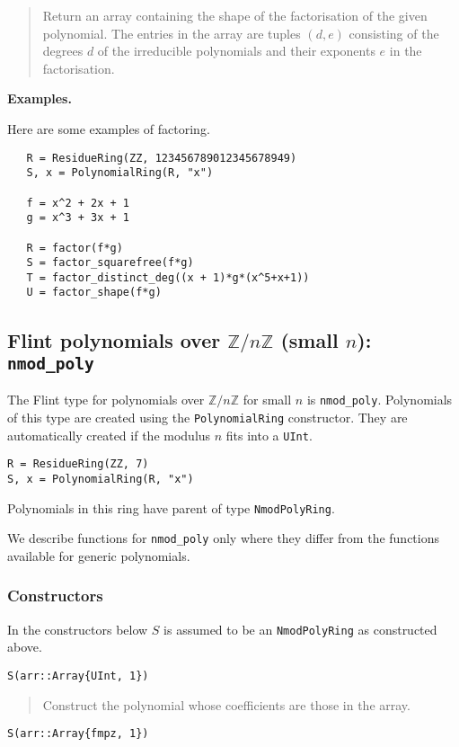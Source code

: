 \documentclass[a4paper,10pt]{article}
\newcommand{\Z}{\mathbb{Z}}
\newcommand{\code}{\lstinline}
\newcommand{\desc}[1]{\vspace{-3mm}\begin{quote}#1\end{quote}}
\begin{document}
{{\desc{Return an array containing the shape of the factorisation of the given polynomial.
The entries in the array are tuples $(d, e)$ consisting of the degrees $d$ of the
irreducible polynomials and their exponents $e$ in the factorisation.}

\textbf{Examples.}

Here are some examples of factoring.

\begin{lstlisting}
   R = ResidueRing(ZZ, 123456789012345678949)
   S, x = PolynomialRing(R, "x")

   f = x^2 + 2x + 1
   g = x^3 + 3x + 1

   R = factor(f*g)
   S = factor_squarefree(f*g)
   T = factor_distinct_deg((x + 1)*g*(x^5+x+1))
   U = factor_shape(f*g)
\end{lstlisting}

\subsection{Flint polynomials over $\Z/n\Z$ (small $n$): \code{nmod_poly}}

The Flint type for polynomials over $\Z/n\Z$ for small $n$ is \code{nmod_poly}. Polynomials
of this type are created using the \code{PolynomialRing} constructor. They are automatically
created if the modulus $n$ fits into a \code{UInt}.

\begin{lstlisting}
R = ResidueRing(ZZ, 7)
S, x = PolynomialRing(R, "x")
\end{lstlisting}

Polynomials in this ring have parent of type \code{NmodPolyRing}.

We describe functions for \code{nmod_poly} only where they differ from the functions
available for generic polynomials.

\subsubsection{Constructors}

In the constructors below $S$ is assumed to be an \code{NmodPolyRing} as constructed above.

\begin{lstlisting}
S(arr::Array{UInt, 1})
\end{lstlisting}

\desc{Construct the polynomial whose coefficients are those in the array.}

\begin{lstlisting}
S(arr::Array{fmpz, 1})
\end{lstlisting}

}}
\end{document}
